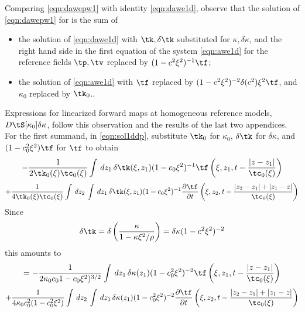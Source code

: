 Comparing \ref{eqn:dawepw1} with identity
\ref{eqn:dawe1d}, observe that the solution of \ref{eqn:dawepw1} for is
the sum of
\begin{itemize}
\item the solution of \ref{eqn:dawe1d} with $\tk, \delta \tk$
  substituted for $\kappa, \delta \kappa$, and the right hand side in
  the first equation of the system \ref{eqn:awe1d} for
  the reference fields $\tp, \tv$ replaced by $(1-c^2\xi^2)^{-1}\tf$;
\item the solution of \ref{eqn:awe1d} with $\tf$ replaced by
  $(1-c^2\xi^2)^{-2}\delta (c^2)\xi^2\tf$, and $\kappa_0$ replaced by $\tk_0$..
\end{itemize}

Expressions for linearized forward maps at homogeneous reference
models, $D\tS[\kappa_0]\delta \kappa$, follow this observation and the
results of the last two appendices. For the first summand, in
\ref{eqn:sol1ddp}, substitute $\tk_0$ for $\kappa_0$, $\delta \tk$ for
$\delta \kappa$, and $(1-c_0^2\xi^2)\tf$ for $\tf$ to obtain
\[
-\frac{1}{2\tk_0(\xi)\tc_0(\xi)} \int \,dz_1\, \delta 
\tk(\xi,z_1)(1-c_0\xi^2)^{-1} \tf \left(\xi,z_1,t - \frac{|z-z_1|}{\tc_0(\xi)}\right)
\]
\[
  + \frac{1}{4\tk_0(\xi)\tc_0(\xi)} \int\,dz_2 \, \int \,dz_1\,\delta 
  \tk(\xi,z_1) (1-c_0\xi^2)^{-1}\frac{\partial \tf}{\partial t}\left(\xi,z_2,t - \frac{|z_2-z_1|+|z_1-z|}{\tc_0(\xi)}\right) 
\]
Since
\[
\delta \tk = \delta \left(\frac{\kappa}{1-\kappa \xi^2/\rho}\right) = \delta \kappa (1-c^2\xi^2)^{-2}
\]
this amounts to
\[
=  -\frac{1}{2\kappa_0c_0 1-c_0\xi^2)^{3/2}} \int \,dz_1\, \delta 
\kappa(z_1) (1-c_0^2\xi^2)^{-2} \tf \left(\xi,z_1,t - \frac{|z-z_1|}{\tc_0(\xi)}\right) 
\]
\begin{equation}
  \label{eqn:solpwdp1}
  + \frac{1}{4\kappa_0c_0^2(1-c_0^2\xi^2)} \int\,dz_2 \, \int \,dz_1\,\delta 
  \kappa(z_1) (1-c_0^2\xi^2)^{-2}  \frac{\partial \tf}{\partial t}\left(\xi,z_2,t - \frac{|z_2-z_1|+|z_1-z|}{\tc_0(\xi)}\right) 
\end{equation}

